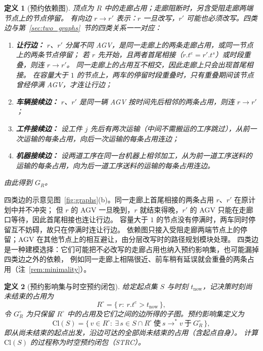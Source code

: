 \documentclass[manuscript,screen,review]{acmart}
\providecommand{\STRC}{\textsc{STRC}}
\newtheorem{definition}{定义}
\begin{document}
\begin{definition}[预约依赖图]
\label{def:dep}
顶点为 \(R\) 中的走廊占用；走廊阻断时，另含受阻走廊两端节点上的节点停留。
有向边 \(r\to r'\) 表示：\(r\) 一旦改写，\(r'\) 可能也必须改写。四类边与第~\ref{sec:two_graphs}~节的四类关系一一对应：
\begin{enumerate}[leftmargin=1.4em,itemsep=0.15em]
\item \textbf{让行边：} \(r\)、\(r'\) 分属不同 AGV，是同一走廊上的两条走廊占用，或同一节点上的两条节点停留；
若 \(r\) 先开始，且两者首尾相接（\(r.t^e=r'.t^s\)）或时段重叠，则连 \(r\to r'\)。
同一走廊上的占用互不相交，因此走廊上只会出现首尾相接。
在容量大于 \(1\) 的节点上，两车的停留时段重叠时，只有重叠期间该节点曾经停满 AGV，才连让行边；
\item \textbf{车辆接续边：} \(r\)、\(r'\) 是同一辆 AGV 按时间先后相邻的两条占用，则连 \(r\to r'\)；
\item \textbf{工件接续边：} 设工件 \(j\) 先后有两次运输（中间不需搬运的工序跳过），从前一次运输的每条占用，向后一次运输的每条占用连边；
\item \textbf{机器接续边：} 设两道工序在同一台机器上相邻加工，从为前一道工序送料的运输的每条占用，向为后一道工序送料的运输的每条占用连边。
\end{enumerate}
由此得到 \(G_R\)。
\end{definition}

四类边的示意见图~\ref{fig:graphs}(b)。同一走廊上首尾相接的两条占用 \(r\)、\(r'\) 在原计划中并不冲突；
但 \(r\) 的 AGV 一旦晚到，\(r\) 就结束得晚，\(r'\) 的 AGV 只能在走廊口等待，因此首尾相接也连让行边。
容量大于 \(1\) 的节点没有停满时，两车同时停留互不妨碍，故只在停满时连让行边。
依赖图只接入受阻走廊两端节点上的停留；AGV 在其他节点上的相互避让，由分层改写时的路径规划模块处理。
四类边是一种建模选择：它们可能把不必改写的走廊占用也纳入预约影响集，也可能漏掉四类边之外的依赖，
例如同一走廊上相隔很近、前车稍有延误就会重叠的两条占用（注~\ref{rem:minimality}）。

\begin{definition}[预约影响集与时空预约闭包]
\label{def:strc}
给定起点集 \(S\) 与时刻 \(t_{\mathrm{now}}\)，记决策时刻尚未结束的占用为
\[
R^{\circ}=\bigl\{\,r:\ r.t^e>t_{\mathrm{now}}\,\bigr\},
\]
令 \(G_R^\circ\) 为只保留 \(R^{\circ}\) 中的占用及它们之间的边所得的子图。预约影响集定义为
\[
\mathrm{Cl}(S)
=\bigl\{\,v\in R^{\circ}:\
   \exists\,s\in S\cap R^{\circ}\ \text{使}\ s\!\to^*\!v\ \text{于}\ G_R^\circ\,\bigr\},
\]
即从尚未结束的起点出发，沿边可达的全部尚未结束的占用（含起点自身）。
计算 \(\mathrm{Cl}(S)\) 的过程称为时空预约闭包（\STRC）。
\end{definition}
\end{document}
